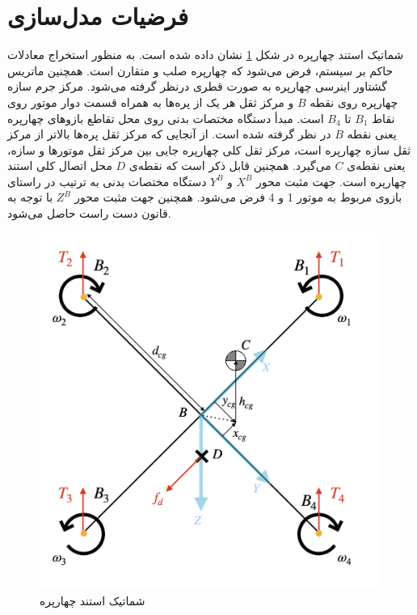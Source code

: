 \section{فرضیات مدل‌سازی}
شماتیک استند چهارپره در شكل \ref{QuadAssum} نشان داده شده است. به ‌منظور استخراج معادلات حاکم بر سیستم، 
فرض می‌شود که چهارپره صلب و متقارن است. همچنین ماتریس گشتاور اینرسی چهارپره به صورت قطری درنظر گرفته می‌شود. مرکز جرم سازه چهارپره روی نقطه $B$ و مرکز ثقل هر یک از پره‌ها به همراه قسمت دوار موتور روی نقاط 
$B_1$
تا
$B_4$
است. مبدأ دستگاه مختصات بدنی روی محل تقاطع بازوهای چهارپره یعنی نقطه 
$B$
در نظر گرفته شده است. از آنجایی ‌که مرکز ثقل پره‌ها بالاتر از مرکز ثقل سازه چهارپره است، مرکز ثقل کلی چهارپره جایی بین مرکز ثقل موتورها و سازه، یعنی نقطه‌ی 
$C$
می‌گیرد. همچنین قابل ذکر است که نقطه‌ی
$D$
محل اتصال کلی استند چهارپره است. جهت مثبت محور 
$X^B$
و
$Y^B$
دستگاه مختصات بدنی به ترتیب در راستای بازوی مربوط به موتور 1 و 4 فرض می‌شود. همچنین جهت مثبت محور
$Z^B$
با توجه به قانون دست راست حاصل می‌شود.
\begin{figure}[H]
	\includegraphics[width=12cm]{../Figures/Forces/StandAssumations.png}
	\centering
	\caption{شماتیک استند چهارپره}
	\label{QuadAssum}
\end{figure}